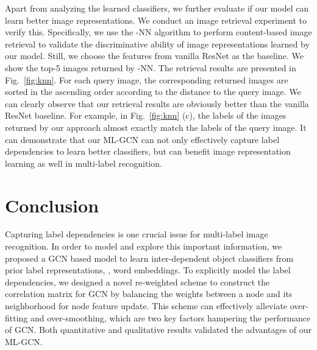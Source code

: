 \documentclass[10pt,twocolumn,letterpaper]{article}
\begin{document}
Apart from analyzing the learned classifiers, we further evaluate if our model can learn better image representations. We conduct an image retrieval experiment to verify this. Specifically, we use the -NN algorithm to perform content-based image retrieval to validate the discriminative ability of image representations learned by our model. Still, we choose the features from vanilla ResNet as the baseline. We show the top-5 images returned by -NN. The retrieval results are presented in Fig.~\ref{fig:knn}. For each query image, the corresponding returned images are sorted in the ascending order according to the distance to the query image. We can clearly observe that our retrieval results are obviously better than the vanilla ResNet baseline. For example,  in Fig.~\ref{fig:knn} (c), the labels of the images returned by our approach almost exactly match the labels of the query image. It can demonstrate that our ML-GCN can not only effectively capture label dependencies to learn better classifiers, but can benefit image representation learning as well in multi-label recognition.

\section{Conclusion}

Capturing label dependencies is one crucial issue for multi-label image recognition. In order to model and explore this important information, we proposed a GCN based model to learn inter-dependent object classifiers from prior label representations, \eg, word embeddings. To explicitly model the label dependencies, we designed a novel re-weighted scheme to construct the correlation matrix for GCN by balancing the weights between a node and its neighborhood for node feature update. This scheme can effectively alleviate over-fitting and over-smoothing, which are two key factors hampering the performance of GCN. Both quantitative and qualitative results validated the advantages of our ML-GCN.




{\small


}
\end{document}
